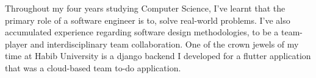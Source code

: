 


Throughout my four years studying Computer Science, I've learnt that the primary role of a software engineer is to, solve real-world problems. I've also accumulated experience regarding software design methodologies, to be a team-player and interdisciplinary team collaboration. One of the crown jewels of my time at Habib University is a django backend I developed for a flutter application that was a cloud-based team to-do application.